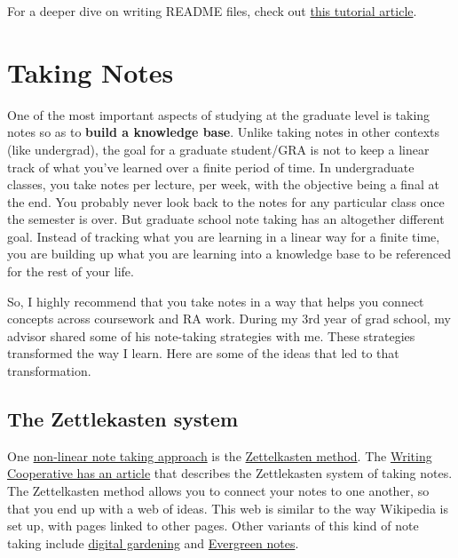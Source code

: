 \documentclass[
]{book}
\begin{document}
For a deeper dive on writing README files, check out \href{https://www.freecodecamp.org/news/how-to-write-a-good-readme-file/}{this tutorial article}.

\hypertarget{taking-notes}{%
\chapter{Taking Notes}\label{taking-notes}}

One of the most important aspects of studying at the graduate level is taking notes so as to \textbf{build a knowledge base}. Unlike taking notes in other contexts (like undergrad), the goal for a graduate student/GRA is not to keep a linear track of what you've learned over a finite period of time. In undergraduate classes, you take notes per lecture, per week, with the objective being a final at the end. You probably never look back to the notes for any particular class once the semester is over. But graduate school note taking has an altogether different goal. Instead of tracking what you are learning in a linear way for a finite time, you are building up what you are learning into a knowledge base to be referenced for the rest of your life.

So, I highly recommend that you take notes in a way that helps you connect concepts across coursework and RA work. During my 3rd year of grad school, my advisor shared some of his note-taking strategies with me. These strategies transformed the way I learn. Here are some of the ideas that led to that transformation.

\hypertarget{zettelkasten}{%
\section{The Zettlekasten system}\label{zettelkasten}}

One \href{https://en.wikipedia.org/wiki/Note-taking\#Non-linear_note-taking}{non-linear note taking approach} is the \href{https://zettelkasten.de/posts/overview/}{Zettelkasten method}. The \href{https://writingcooperative.com/zettelkasten-how-one-german-scholar-was-so-freakishly-productive-997e4e0ca125}{Writing Cooperative has an article} that describes the Zettlekasten system of taking notes. The Zettelkasten method allows you to connect your notes to one another, so that you end up with a web of ideas. This web is similar to the way Wikipedia is set up, with pages linked to other pages. Other variants of this kind of note taking include \href{https://maggieappleton.com/garden-history}{digital gardening} and \href{https://notes.andymatuschak.org/Evergreen_note-writing_as_fundamental_unit_of_knowledge_work?stackedNotes=z4SDCZQeRo4xFEQ8H4qrSqd68ucpgE6LU155C}{Evergreen notes}.
\end{document}
